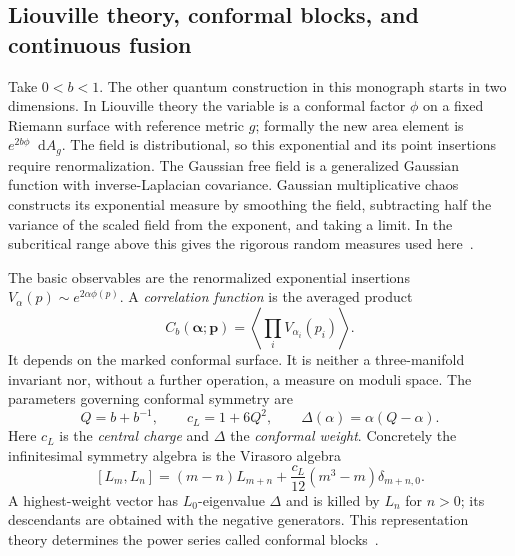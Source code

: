 \documentclass[11pt,a4paper]{article}
\numberwithin{equation}{section}
\theoremstyle{definition}
\theoremstyle{remark}
\newcommand{\dd}{\mathop{}\!\mathrm d}
\begin{document}
\subsection{Liouville theory, conformal blocks, and continuous fusion}
\label{sec:introLiouville}

Take $0<b<1$. The other quantum construction in this monograph starts in two
dimensions. In Liouville theory the variable is a conformal factor
$\phi$ on a fixed Riemann surface with reference metric $g$;
formally the new area element is $e^{2b\phi}\dd A_g$.
The field is distributional, so this exponential and its point
insertions require renormalization. The Gaussian free field is a
generalized Gaussian function with inverse-Laplacian covariance.
Gaussian multiplicative chaos constructs its exponential measure
by smoothing the field, subtracting half the variance of the
scaled field from the exponent, and taking a limit. In the subcritical range above this
gives the rigorous random measures used here~\cite{KRV}.

The basic observables are the renormalized exponential insertions
$V_\alpha(p)\sim e^{2\alpha\phi(p)}$. A \emph{correlation function}
is the averaged product
\[
 C_b(\boldsymbol\alpha;\boldsymbol p)
       =\left\langle\prod_i V_{\alpha_i}(p_i)\right\rangle.
\]
It depends on the marked conformal surface. It is neither a
three-manifold invariant nor, without a further operation, a
measure on moduli space. The parameters governing conformal
symmetry are
\begin{equation}
 Q=b+b^{-1},\qquad c_L=1+6Q^2,\qquad
 \Delta(\alpha)=\alpha(Q-\alpha).
 \label{eq:introLiouvilleparameters}
\end{equation}
Here $c_L$ is the \emph{central charge} and $\Delta$ the
\emph{conformal weight}. Concretely the infinitesimal symmetry
algebra is the Virasoro algebra
\[
 [L_m,L_n]=(m-n)L_{m+n}
       +\frac{c_L}{12}(m^3-m)\delta_{m+n,0}.
\]
A highest-weight vector has $L_0$-eigenvalue $\Delta$ and is killed
by $L_n$ for $n>0$; its descendants are obtained with the negative
generators. This representation theory determines the power
series called conformal blocks~\cite{TeschnerRevisited}.
\end{document}

